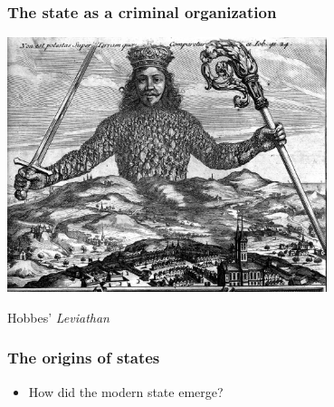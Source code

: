 \documentclass[utf8, xcolor=dvipsnames, handout]{beamer}
\begin{document}
\begin{frame}
\frametitle{The state as a criminal organization}
\centering

\includegraphics[width = 0.7\textwidth]{img/leviathan}

\vspace{20pt}

{\small Hobbes' \textit{Leviathan}}

\end{frame}


\begin{frame}
\frametitle{The origins of states}
\centering

\begin{itemize}
  \item How did the modern state emerge?
\end{itemize}

\end{frame}
\end{document}
